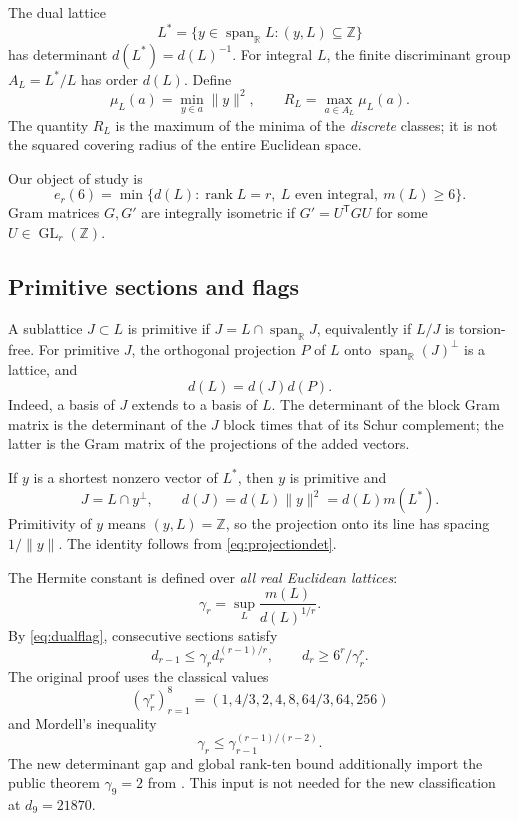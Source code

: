 \documentclass[11pt,a4paper]{article}
\theoremstyle{remark}\newtheorem{remark}[theorem]{Remark}
\newcommand{\Z}{\mathbb Z}\newcommand{\R}{\mathbb R}\newcommand{\F}{\mathbb F}
\newcommand{\GL}{\operatorname{GL}}\newcommand{\rank}{\operatorname{rank}}
\newcommand{\spanR}{\operatorname{span}_{\R}}\newcommand{\diag}{\operatorname{diag}}
\begin{document}
The dual lattice
\[
L^*=\{y\in\spanR L:(y,L)\subseteq\Z\}
\]
has determinant $d(L^*)=d(L)^{-1}$. For integral $L$, the finite discriminant group $A_L=L^*/L$ has order $d(L)$. Define
\[
\mu_L(a)=\min_{y\in a}\|y\|^2,\qquad
R_L=\max_{a\in A_L}\mu_L(a).
\]
The quantity $R_L$ is the maximum of the minima of the \emph{discrete} classes; it is not the squared covering radius of the entire Euclidean space.

Our object of study is
\[
e_r(6)=\min\{d(L):\rank L=r,\ L\text{ even integral},\ m(L)\ge6\}.
\]
Gram matrices $G,G'$ are integrally isometric if $G'=U^{\mathsf T}GU$ for some $U\in\GL_r(\Z)$.

\subsection{Primitive sections and flags}

A sublattice $J\subset L$ is primitive if $J=L\cap\spanR J$, equivalently if $L/J$ is torsion-free. For primitive $J$, the orthogonal projection $P$ of $L$ onto $\spanR(J)^\perp$ is a lattice, and
\begin{equation}\label{eq:projectiondet}
d(L)=d(J)d(P).
\end{equation}
Indeed, a basis of $J$ extends to a basis of $L$. The determinant of the block Gram matrix is the determinant of the $J$ block times that of its Schur complement; the latter is the Gram matrix of the projections of the added vectors.

If $y$ is a shortest nonzero vector of $L^*$, then $y$ is primitive and
\begin{equation}\label{eq:dualflag}
J=L\cap y^\perp,\qquad d(J)=d(L)\|y\|^2=d(L)m(L^*).
\end{equation}
Primitivity of $y$ means $(y,L)=\Z$, so the projection onto its line has spacing $1/\|y\|$. The identity follows from \eqref{eq:projectiondet}.

The Hermite constant is defined over \emph{all real Euclidean lattices}:
\[
\gamma_r=\sup_L\frac{m(L)}{d(L)^{1/r}}.
\]
By \eqref{eq:dualflag}, consecutive sections satisfy
\begin{equation}\label{eq:windows}
d_{r-1}\le\gamma_r d_r^{(r-1)/r},\qquad
d_r\ge6^r/\gamma_r^r.
\end{equation}
The original proof uses the classical values
\[
(\gamma_r^r)_{r=1}^8=(1,4/3,2,4,8,64/3,64,256)
\]
and Mordell's inequality
\begin{equation}\label{eq:mordell}
\gamma_r\le\gamma_{r-1}^{(r-1)/(r-2)}.
\end{equation}
The new determinant gap and global rank-ten bound additionally import the public theorem $\gamma_9=2$ from \cite{dw}. This input is not needed for the new classification at $d_9=21870$.
\end{document}

